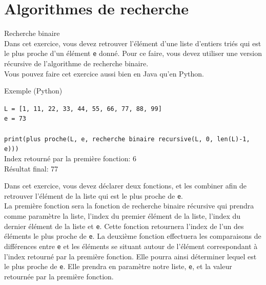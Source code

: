 \section{Algorithmes de recherche}

\begin{Exercice}[15 minutes] Recherche binaire \\

Dans cet exercice, vous devez retrouver l'élément d'une liste d'entiers triés qui est le plus proche d'un élément \lstinline{e} donné. Pour ce faire, vous devez utiliser une version récursive de l'algorithme de recherche binaire.\\

Vous pouvez faire cet exercice aussi bien en Java qu'en Python.

\begin{Example}{\faTerminal \quad Exemple (Python)}


    \lstinline{L = [1, 11, 22, 33, 44, 55, 66, 77, 88, 99]}\\
    \lstinline{e = 73}\\\\
    \lstinline{print(plus proche(L, e, recherche binaire recursive(L, 0, len(L)-1, e)))}\\
    
    Index retourné par la première fonction: 6\\
    Résultat final: 77\\
    
\end{Example}


\begin{conseil}
   Dans cet exercice, vous devez déclarer deux fonctions, et les combiner afin de retrouver l'élément de la liste qui est le plus proche de \lstinline{e}.\\
   
   La première fonction sera la fonction de recherche binaire récursive qui prendra comme paramètre la liste, l'index du premier élément de la liste, l'index du dernier élément de la liste et \lstinline{e}. Cette fonction retournera l'index de l'un des éléments le plus proche de \lstinline{e}. 
   La deuxième fonction effectuera les comparaisons de différences entre \lstinline{e} et les éléments se situant autour de l'élément correspondant à l'index retourné par la première fonction. Elle pourra ainsi déterminer lequel est le plus proche de \lstinline{e}. Elle prendra en paramètre notre liste, \lstinline{e}, et la valeur retournée par la première fonction. \\
\end{conseil}


\end{Exercice}

